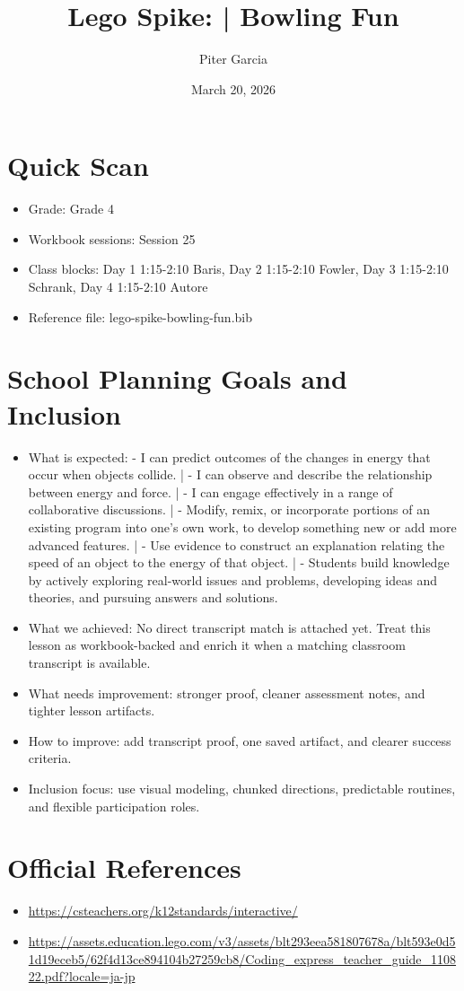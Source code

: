 \documentclass[11pt]{article}
\title{Lego Spike: | Bowling Fun}
\author{Piter Garcia}
\date{March 20, 2026}
\begin{document}
    \maketitle
    \section*{Quick Scan}
    \begin{itemize}[leftmargin=*]
    \item Grade: Grade 4
    \item Workbook sessions: Session 25
    \item Class blocks: Day 1 1:15-2:10 Baris, Day 2 1:15-2:10 Fowler, Day 3 1:15-2:10 Schrank, Day 4 1:15-2:10 Autore
    \item Reference file: lego-spike-bowling-fun.bib
    \end{itemize}
    \section*{School Planning Goals and Inclusion}
    \begin{itemize}[leftmargin=*]
    \item What is expected: - I can predict outcomes of the changes in energy that occur when objects collide. | - I can observe and describe the relationship between energy and force. | - I can engage effectively in a range of collaborative discussions. | - Modify, remix, or incorporate portions of an existing program into one's own work, to develop something new or add more advanced features. | - Use evidence to construct an explanation relating the speed of an object to the energy of that object. | - Students build knowledge by actively exploring real-world issues and problems, developing ideas and theories, and pursuing answers and solutions.
    \item What we achieved: No direct transcript match is attached yet. Treat this lesson as workbook-backed and enrich it when a matching classroom transcript is available.
    \item What needs improvement: stronger proof, cleaner assessment notes, and tighter lesson artifacts.
    \item How to improve: add transcript proof, one saved artifact, and clearer success criteria.
    \item Inclusion focus: use visual modeling, chunked directions, predictable routines, and flexible participation roles.
    \end{itemize}
    \section*{Official References}
    \begin{itemize}[leftmargin=*]
    \item \url{https://csteachers.org/k12standards/interactive/}
\item \url{https://assets.education.lego.com/v3/assets/blt293eea581807678a/blt593e0d51d19eceb5/62f4d13ce894104b27259cb8/Coding_express_teacher_guide_110822.pdf?locale=ja-jp}

    \end{itemize}
    
\end{document}
